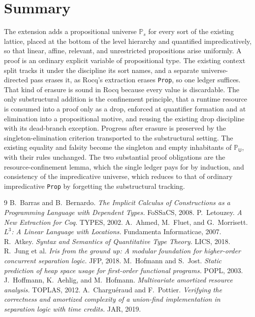 \documentclass[11pt]{article}
\newcommand{\Prop}[1]{\mathbb{P}_{#1}}            %
\theoremstyle{definition}
\theoremstyle{plain}
\begin{document}
\section{Summary}\label{sec:summary}

The extension adds a propositional universe $\Prop{s}$ for every sort of the
existing lattice, placed at the bottom of the level hierarchy and quantified
impredicatively, so that linear, affine, relevant, and unrestricted propositions
arise uniformly. A proof is an ordinary explicit variable of propositional type.
The existing context split tracks it under the discipline its sort names, and a
separate universe-directed pass erases it, as Rocq's extraction erases
\texttt{Prop}, so one ledger suffices. That kind of erasure is sound in Rocq
because every value is discardable. The only substructural addition is the
confinement principle, that a runtime resource is consumed into a proof only as a
drop, enforced at quantifier formation and at elimination into a propositional
motive, and reusing the existing drop discipline with its dead-branch exception.
Progress after erasure is preserved by the singleton-elimination criterion
transported to the substructural setting. The existing equality and falsity become
the singleton and empty inhabitants of $\Prop{\mathsf{U}}$, with their rules
unchanged. The two substantial proof
obligations are the resource-confinement lemma, which the single ledger pays for by
induction, and consistency of the impredicative universe, which reduces to that of
ordinary impredicative \texttt{Prop} by forgetting the substructural tracking.

\begin{thebibliography}{9}
 B.~Barras and B.~Bernardo. \emph{The Implicit Calculus of
Constructions as a Programming Language with Dependent Types.} FoSSaCS, 2008.
 P.~Letouzey. \emph{A New Extraction for Coq.} TYPES, 2002.
 A.~Ahmed, M.~Fluet, and G.~Morrisett. \emph{$L^3$: A Linear Language
with Locations.} Fundamenta Informaticae, 2007.
 R.~Atkey. \emph{Syntax and Semantics of Quantitative Type Theory.}
LICS, 2018.
 R.~Jung et al. \emph{Iris from the ground up: A modular foundation
for higher-order concurrent separation logic.} JFP, 2018.
 M.~Hofmann and S.~Jost. \emph{Static prediction of heap space usage
for first-order functional programs.} POPL, 2003.
 J.~Hoffmann, K.~Aehlig, and M.~Hofmann. \emph{Multivariate
amortized resource analysis.} TOPLAS, 2012.
 A.~Charguéraud and F.~Pottier. \emph{Verifying the
correctness and amortized complexity of a union-find implementation in separation
logic with time credits.} JAR, 2019.
\end{thebibliography}
\end{document}
